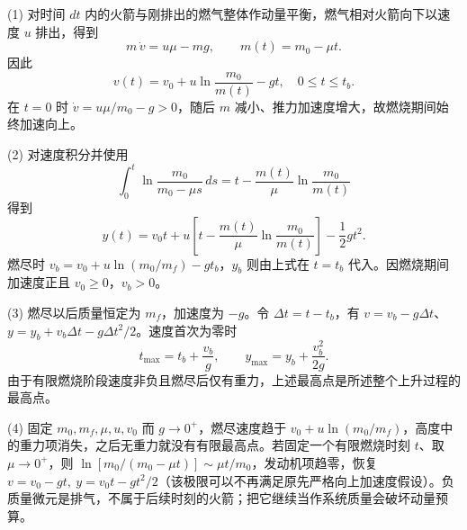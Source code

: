 (1) 对时间 \(dt\) 内的火箭与刚排出的燃气整体作动量平衡，燃气相对火箭向下以速度 \(u\) 排出，得到
\[
m\,\dot v=u\mu-mg,\qquad m(t)=m_0-\mu t.
\]
因此
\[
v(t)=v_0+u\ln\frac{m_0}{m(t)}-gt,\quad 0\le t\le t_b.
\]
在 \(t=0\) 时 \(\dot v=u\mu/m_0-g>0\)，随后 \(m\) 减小、推力加速度增大，故燃烧期间始终加速向上。

(2) 对速度积分并使用
\[
\int_0^t\ln\frac{m_0}{m_0-\mu s}\,ds
=t-\frac{m(t)}{\mu}\ln\frac{m_0}{m(t)}
\]
得到
\[
y(t)=v_0t+u\left[t-\frac{m(t)}{\mu}\ln\frac{m_0}{m(t)}\right]-\frac12gt^2.
\]
燃尽时 \(v_b=v_0+u\ln(m_0/m_f)-gt_b\)，\(y_b\) 则由上式在 \(t=t_b\) 代入。因燃烧期间加速度正且 \(v_0\ge0\)，\(v_b>0\)。

(3) 燃尽以后质量恒定为 \(m_f\)，加速度为 \(-g\)。令 \(\Delta t=t-t_b\)，有 \(v=v_b-g\Delta t\)、\(y=y_b+v_b\Delta t-g\Delta t^2/2\)。速度首次为零时
\[
t_{\max}=t_b+\frac{v_b}{g},\qquad y_{\max}=y_b+\frac{v_b^2}{2g}.
\]
由于有限燃烧阶段速度非负且燃尽后仅有重力，上述最高点是所述整个上升过程的最高点。

(4) 固定 \(m_0,m_f,\mu,u,v_0\) 而 \(g\to0^+\)，燃尽速度趋于 \(v_0+u\ln(m_0/m_f)\)，高度中的重力项消失，之后无重力就没有有限最高点。若固定一个有限燃烧时刻 \(t\)、取 \(\mu\to0^+\)，则 \(\ln[m_0/(m_0-\mu t)]\sim\mu t/m_0\)，发动机项趋零，恢复 \(v=v_0-gt,\ y=v_0t-gt^2/2\)（该极限可以不再满足原先严格向上加速度假设）。负质量微元是排气，不属于后续时刻的火箭；把它继续当作系统质量会破坏动量预算。
